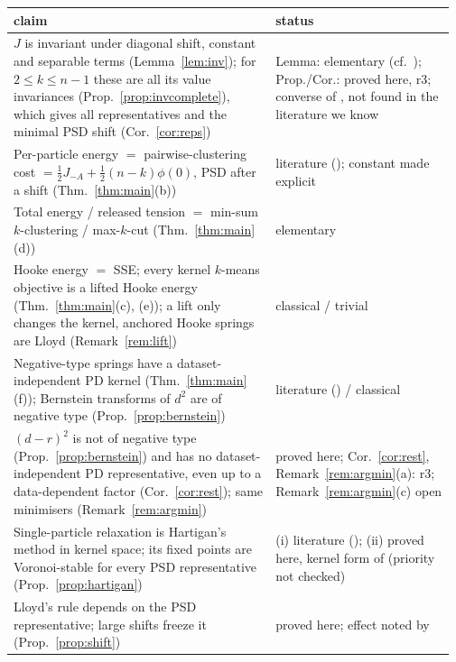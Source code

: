 \documentclass[11pt,a4paper]{article}
\theoremstyle{plain}
\theoremstyle{definition}
\theoremstyle{remark}
\begin{document}
\begin{table}[t]
\centering\scriptsize
\setlength{\tabcolsep}{3pt}\setlength{\extrarowheight}{0.5pt}
\begin{tabular}{>{\raggedright\arraybackslash}p{0.58\linewidth}>{\raggedright\arraybackslash}p{0.39\linewidth}}
\toprule
claim & status\\
\midrule
$J$ is invariant under diagonal shift, constant and separable terms (Lemma~\ref{lem:inv}); for $2\le k\le n-1$ these are all its value invariances (Prop.~\ref{prop:invcomplete}), which gives all representatives and the minimal PSD shift (Cor.~\ref{cor:reps}) & Lemma: elementary (cf.\ \citealp{roth2003,dhillon2007}); Prop./Cor.: proved here, r3; converse of \citealp{roth2003}, not found in the literature we know\\
Per-particle energy $=$ pairwise-clustering cost $=\tfrac12J_{-A}+\tfrac12(n-k)\phi(0)$, PSD after a shift (Thm.~\ref{thm:main}(b)) & literature (\citealp{hofmann1997,roth2003,dhillon2005tr,dhillon2007}); constant made explicit\\
Total energy / released tension $=$ min-sum $k$-clustering / max-$k$-cut (Thm.~\ref{thm:main}(d)) & elementary\\
Hooke energy $=$ SSE; every kernel $k$-means objective is a lifted Hooke energy (Thm.~\ref{thm:main}(c), (e)); a lift only changes the kernel, anchored Hooke springs are Lloyd (Remark~\ref{rem:lift}) & classical / trivial\\
Negative-type springs have a dataset-independent PD kernel (Thm.~\ref{thm:main}(f)); Bernstein transforms of $d^2$ are of negative type (Prop.~\ref{prop:bernstein}) & literature (\citealp{bcr1984,sejdinovic2013,franca2021}) / classical\\
$(d-r)^2$ is not of negative type (Prop.~\ref{prop:bernstein}) and has no dataset-independent PD representative, even up to a data-dependent factor (Cor.~\ref{cor:rest}); same minimisers (Remark~\ref{rem:argmin}) & proved here; Cor.~\ref{cor:rest}, Remark~\ref{rem:argmin}(a): r3; Remark~\ref{rem:argmin}(c) open\\
Single-particle relaxation is Hartigan's method in kernel space; its fixed points are Voronoi-stable for every PSD representative (Prop.~\ref{prop:hartigan}) & (i) literature (\citealp{franca2021}); (ii) proved here, kernel form of \citealp{telgarsky2010} (priority not checked)\\
Lloyd's rule depends on the PSD representative; large shifts freeze it (Prop.~\ref{prop:shift}) & proved here; effect noted by \citet{dhillon2005tr,dhillon2007}\\

\end{tabular}
\end{table}
\end{document}
